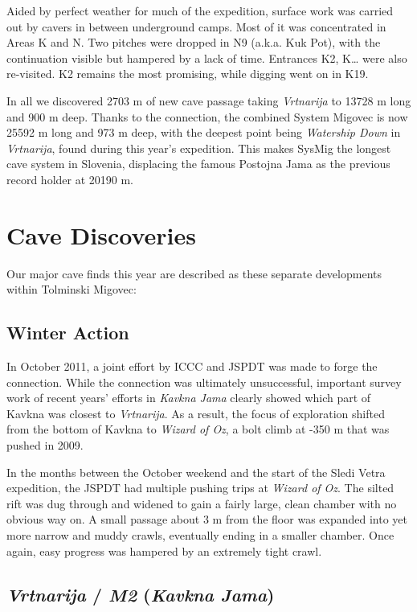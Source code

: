 Aided by perfect weather for much of the expedition, surface work was
carried out by cavers in between underground camps. Most of it was
concentrated in Areas K and N. Two pitches were dropped in N9 (a.k.a.
Kuk Pot), with the continuation visible but hampered by a lack of time.
Entrances K2, K\ldots{} were also re-visited. K2 remains the most
promising, while digging went on in K19.

In all we discovered 2703 m of new cave passage taking \emph{Vrtnarija}
to 13728 m long and 900 m deep. Thanks to the connection, the combined
System Migovec is now 25592 m long and 973 m deep, with the deepest
point being \emph{Watership Down} in \emph{Vrtnarija}, found during this
year's expedition. This makes SysMig the longest cave system in
Slovenia, displacing the famous Postojna Jama as the previous record
holder at 20190 m.

\hypertarget{cave-discoveries-1}{%
\section{Cave Discoveries}\label{cave-discoveries-1}}

Our major cave finds this year are described as these separate
developments within Tolminski Migovec:

\hypertarget{winter-action}{%
\subsection{Winter Action}\label{winter-action}}

In October 2011, a joint effort by ICCC and JSPDT was made to forge the
connection. While the connection was ultimately unsuccessful, important
survey work of recent years' efforts in \emph{Kavkna Jama} clearly
showed which part of Kavkna was closest to \emph{Vrtnarija}. As a
result, the focus of exploration shifted from the bottom of Kavkna to
\emph{Wizard of Oz}, a bolt climb at -350 m that was pushed in 2009.

In the months between the October weekend and the start of the Sledi
Vetra expedition, the JSPDT had multiple pushing trips at \emph{Wizard
of Oz}. The silted rift was dug through and widened to gain a fairly
large, clean chamber with no obvious way on. A small passage about 3 m
from the floor was expanded into yet more narrow and muddy crawls,
eventually ending in a smaller chamber. Once again, easy progress was
hampered by an extremely tight crawl.

\hypertarget{vrtnarija-m2-kavkna-jama}{%
\subsection{\texorpdfstring{\emph{Vrtnarija} / \emph{M2} (\emph{Kavkna
Jama})}{Vrtnarija / M2 (Kavkna Jama)}}\label{vrtnarija-m2-kavkna-jama}}

